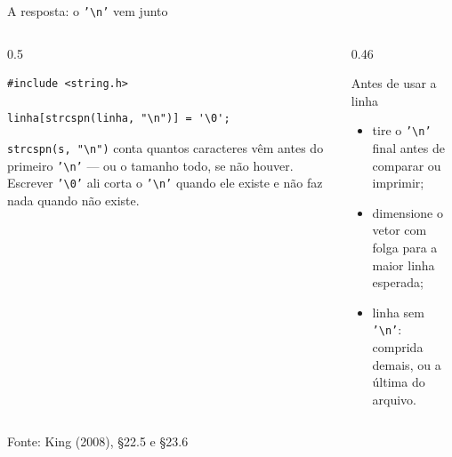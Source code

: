 \documentclass[aspectratio=169]{beamer}
\newcommand{\fileira}[4]{%
  \foreach \c [count=\k from 0] in {#4} {
    \node[#3] at (#1+0.36*\k, #2) {\c};
  }
}
\newcommand{\fonte}[1]{\vfill\hfill{\scriptsize\textcolor{UFSGray}{Fonte: #1}}}
\begin{document}
\begin{frame}[fragile]{A resposta: o \texttt{'\textbackslash n'} vem junto}
  \begin{center}
  \end{center}
  \vspace{-0.2em}
  \begin{columns}[T]
    \begin{column}{0.5\textwidth}
\begin{lstlisting}[style=codC]
#include <string.h>

linha[strcspn(linha, "\n")] = '\0';
\end{lstlisting}
      \small \texttt{strcspn(s, "\textbackslash n")} conta quantos caracteres
      vêm antes do primeiro \texttt{'\textbackslash n'} --- ou o tamanho
      todo, se não houver. Escrever \texttt{'\textbackslash 0'} ali corta o
      \texttt{'\textbackslash n'} quando ele existe e não faz nada quando
      não existe.
    \end{column}
    \begin{column}{0.46\textwidth}
      \begin{block}{Antes de usar a linha}
        \small
        \begin{itemize}
          \item tire o \texttt{'\textbackslash n'} final antes de comparar
            ou imprimir;
          \item dimensione o vetor com folga para a maior linha esperada;
          \item linha sem \texttt{'\textbackslash n'}: comprida demais, ou
            a última do arquivo.
        \end{itemize}
      \end{block}
    \end{column}
  \end{columns}
  \fonte{King (2008), §22.5 e §23.6~\cite{king2008c}}
\end{frame}
\end{document}
